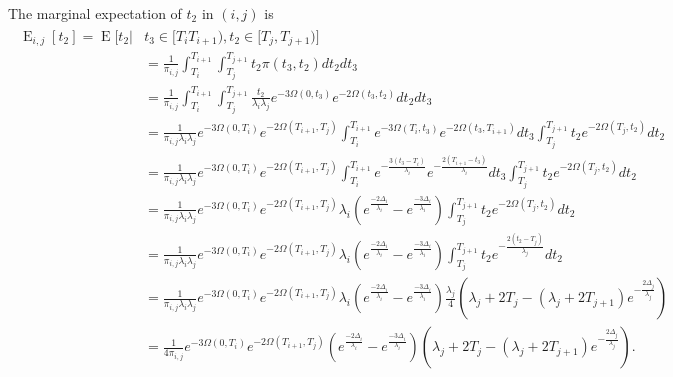 \documentclass{article}
\DeclareMathOperator{\E}{E}
\begin{document}
The marginal expectation of $t_2$ in $(i,j)$ is 
\begin{align}
    \begin{split}
        \E_{i,j}[t_2] = \E\big[t_2|&t_3 \in [T_i T_{i+1}),t_2 \in [T_j,T_{j+1}) \big]\\
        &= \frac{1}{\pi_{i,j}}\int_{T_i}^{T_{i+1}}\int_{T_j}^{T_{j+1}}t_2\pi(t_3,t_2)dt_2dt_3\\
        &= \frac{1}{\pi_{i,j}}\int_{T_i}^{T_{i+1}}\int_{T_j}^{T_{j+1}}
            \frac{t_2}{\lambda_i \lambda_j}e^{-3\Omega(0,t_3)}e^{-2\Omega(t_3,t_2)}dt_2dt_3\\
        &= \frac{1}{\pi_{i,j}\lambda_i\lambda_j}e^{-3\Omega(0,T_i)}e^{-2\Omega(T_{i+1},T_j)}
            \int_{T_i}^{T_{i+1}}e^{-3\Omega(T_i,t_3)}e^{-2\Omega(t_3,T_{i+1})}dt_3
            \int_{T_j}^{T_{j+1}}t_2e^{-2\Omega(T_j,t_2)}dt_2\\
        &= \frac{1}{\pi_{i,j}\lambda_i\lambda_j}e^{-3\Omega(0,T_i)}e^{-2\Omega(T_{i+1},T_j)}
            \int_{T_i}^{T_{i+1}}e^{-\frac{3(t_3-T_i)}{\lambda_i}}e^{-\frac{2(T_{i+1}-t_3)}{\lambda_i}}dt_3
            \int_{T_j}^{T_{j+1}}t_2e^{-2\Omega(T_j,t_2)}dt_2\\
        &= \frac{1}{\pi_{i,j}\lambda_i\lambda_j}e^{-3\Omega(0,T_i)}e^{-2\Omega(T_{i+1},T_j)}
            \lambda_i \left(e^{\frac{-2\Delta_i}{\lambda_i}}-e^{\frac{-3\Delta_i}{\lambda_i}}\right)
            \int_{T_j}^{T_{j+1}}t_2e^{-2\Omega(T_j,t_2)}dt_2\\
        &= \frac{1}{\pi_{i,j}\lambda_i\lambda_j}e^{-3\Omega(0,T_i)}e^{-2\Omega(T_{i+1},T_j)}
            \lambda_i \left(e^{\frac{-2\Delta_i}{\lambda_i}}-e^{\frac{-3\Delta_i}{\lambda_i}}\right)
            \int_{T_j}^{T_{j+1}}t_2e^{-\frac{2(t_2-T_j)}{\lambda_j}}dt_2\\
        &= \frac{1}{\pi_{i,j}\lambda_i\lambda_j}e^{-3\Omega(0,T_i)}e^{-2\Omega(T_{i+1},T_j)}
            \lambda_i \left(e^{\frac{-2\Delta_i}{\lambda_i}}-e^{\frac{-3\Delta_i}{\lambda_i}}\right)
            \frac{\lambda_j}{4}\left(\lambda_j+2T_j-(\lambda_j +2 T_{j+1}) e^{-\frac{2\Delta_j}{\lambda_j}}\right)\\
        &= \frac{1}{4\pi_{i,j}}e^{-3\Omega(0,T_i)}e^{-2\Omega(T_{i+1},T_j)}
            \left(e^{\frac{-2\Delta_i}{\lambda_i}}-e^{\frac{-3\Delta_i}{\lambda_i}}\right)
            \left(\lambda_j+2T_j-(\lambda_j +2 T_{j+1}) e^{-\frac{2\Delta_j}{\lambda_j}}\right).
    \end{split}
    \label{eq:Et2}
\end{align}
\end{document}
